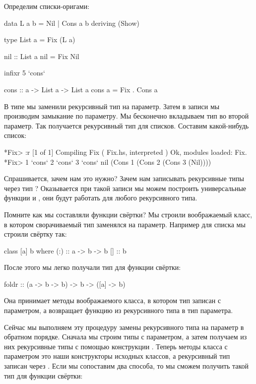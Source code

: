 Определим списки-оригами:

\begin{code}
data L a b = Nil | Cons a b
    deriving (Show)

type List a = Fix (L a)

nil :: List a
nil = Fix Nil

infixr 5 `cons`

cons :: a -> List a -> List a
cons a = Fix . Cons a
\end{code}

В типе  мы заменили рекурсивный тип на параметр. 
Затем в записи  мы производим замыкание 
по параметру. Мы бесконечно вкладываем тип  во второй
параметр. Так получается рекурсивный тип для списков. 
Составим какой-нибудь список:

\begin{code}
*Fix> :r
[1 of 1] Compiling Fix              ( Fix.hs, interpreted )
Ok, modules loaded: Fix.
*Fix> 1 `cons` 2 `cons` 3 `cons` nil
(Cons 1 (Cons 2 (Cons 3 (Nil))))
\end{code}

Спрашивается, зачем нам это нужно? Зачем нам записывать
рекурсивные типы через тип ? Оказывается при такой
записи мы можем построить универсальные функции  и ,
они будут работать для любого рекурсивного типа.

Помните как мы составляли функции свёртки? Мы строили 
воображаемый класс, в котором сворачиваемый тип заменялся
на параметр. Например для списка мы строили свёртку так:

\begin{code}
class [a] b where
    (:) :: a -> b -> b
    []  :: b
\end{code}

После этого мы легко получали тип для функции свёртки:

\begin{code}
foldr :: (a -> b -> b) -> b -> ([a] -> b)
\end{code}

Она принимает методы воображаемого класса, в котором
тип записан с параметром, а возвращает функцию из
рекурсивного типа в тип параметра.

Сейчас мы выполняем эту процедуру замены рекурсивного 
типа на параметр в обратном порядке. Сначала мы строим типы с 
параметром, а затем получаем из них рекурсивные типы с помощью
конструкции . Теперь методы класса с параметром это
наши конструкторы исходных классов, а рекурсивный тип записан
через . Если мы сопоставим два способа, то мы сможем
получить такой тип для функции свёртки:

